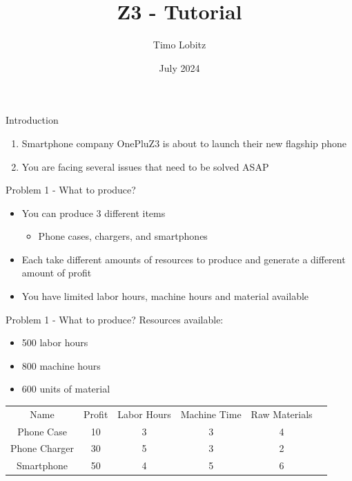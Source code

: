 \documentclass{beamer}
\title{Z3 - Tutorial}
\author{Timo Lobitz}
\date{July 2024}
\begin{document}
\maketitle
\begin{frame}{Introduction}
\begin{enumerate}
    \item Smartphone company OnePluZ3 is about to launch their new flagship phone
    \item You are facing several issues that need to be solved ASAP
\end{enumerate}
    
\end{frame}
\begin{frame}{Problem 1 - What to produce?}
\begin{itemize}
    \item You can produce 3 different items
    \begin{itemize}
        \item Phone cases, chargers, and smartphones
    \end{itemize}
    \item Each take different amounts of resources to produce and generate a different amount of profit
    \item You have limited labor hours, machine hours and material available
\end{itemize}
    
\end{frame}

\begin{frame}{Problem 1 - What to produce?}
Resources available:
\begin{itemize}
    \item 500 labor hours
    \item 800 machine hours
    \item 600 units of material
\end{itemize}

\begin{table}
    \centering
    \begin{tabular}{cccccc}
        Name &  Profit & Labor Hours & Machine Time & Raw Materials \\
        Phone Case &  10 & 3 & 3 & 4\\
        Phone Charger & 30  & 5  & 3 &2 \\
        Smartphone & 50  & 4 & 5 & 6\\
    \end{tabular}
    \label{tab:resource_cost}
\end{table}
    
\end{frame}
\end{document}
